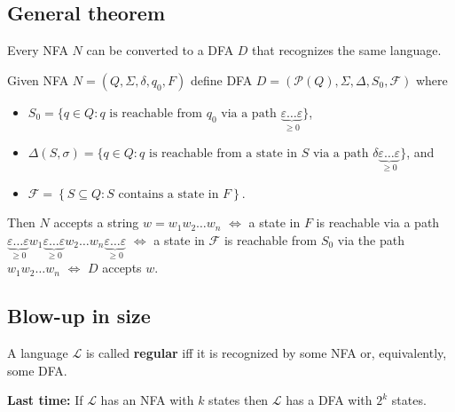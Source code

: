 \documentclass{notes}
\begin{document}
\newpage

\subsection{General theorem}

\begin{thm}
  Every NFA $N$ can be converted to a DFA $D$ that recognizes the same language.
\end{thm}

\begin{prf}
  Given NFA $N = (Q, \Sigma, \delta, q_0, F)$ define DFA $D = (\mathcal P(Q), \Sigma, \Delta, S_0, \mathscr F)$ where 
  \begin{itemize}
    \item $S_0 = \{ q \in Q : \text{$q$ is reachable from $q_0$ via a path $\underbrace{\varepsilon \dots \varepsilon}_{\geq 0}$} \}$, 

    \item $\Delta(S, \sigma) = \{ q \in Q : \text{$q$ is reachable from a state in $S$ via a path $\delta \underbrace{\varepsilon \dots \varepsilon}_{\geq 0}$} \}$, and 

    \item $\mathscr F = \left \{ S \subseteq Q : \text{$S$ contains a state in $F$} \right \}$.
  \end{itemize}
  
  Then $N$ accepts a string $w = w_1 w_2 \dots w_n$ $\Leftrightarrow$ a state in $F$ is reachable via a path $\underbrace{\varepsilon \dots \varepsilon}_{\geq 0} w_1 \underbrace{\varepsilon \dots \varepsilon}_{\geq 0} w_2 \dots w_n \underbrace{\varepsilon \dots \varepsilon}_{\geq 0}$ $\Leftrightarrow$ a state in $\mathscr F$ is reachable from $S_0$ via the path $w_1 w_2 \dots w_n$ $\Leftrightarrow$ $D$ accepts $w$.
\end{prf}

\subsection{Blow-up in size}

\begin{defn}
  A language $\mathcal L$ is called {\boldmath \bfseries regular} iff it is recognized by some NFA or, equivalently, some DFA.
\end{defn}

{\boldmath \bfseries Last time:} If $\mathcal L$ has an NFA with $k$ states then $\mathcal L$ has a DFA with $2^k$ states.
\end{document}
